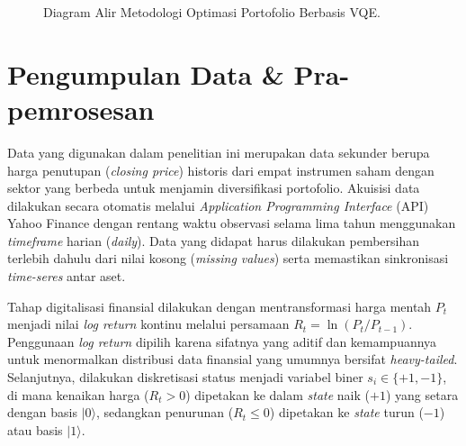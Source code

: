 \begin{figure}[ht]
    \caption{Diagram Alir Metodologi Optimasi Portofolio Berbasis VQE.}
    \label{fig:flowchart}
\end{figure}
\section{Pengumpulan Data \& Pra-pemrosesan}
Data yang digunakan dalam penelitian ini merupakan data sekunder berupa harga penutupan (\textit{closing price}) historis dari empat instrumen saham dengan sektor yang berbeda untuk menjamin diversifikasi portofolio. Akuisisi data dilakukan secara otomatis melalui \textit{Application Programming Interface} (API) Yahoo Finance dengan rentang waktu observasi selama lima tahun menggunakan \textit{timeframe} harian (\textit{daily}). Data yang didapat harus dilakukan pembersihan terlebih dahulu dari nilai kosong (\textit{missing values}) serta memastikan sinkronisasi \textit{time-seres} antar aset.

Tahap digitalisasi finansial dilakukan dengan mentransformasi harga mentah $P_t$ menjadi nilai \textit{log return} kontinu melalui persamaan $R_t = \ln(P_t / P_{t-1})$. Penggunaan \textit{log return} dipilih karena sifatnya yang aditif dan kemampuannya untuk menormalkan distribusi data finansial yang umumnya bersifat \textit{heavy-tailed}. Selanjutnya, dilakukan diskretisasi status menjadi variabel biner $s_i \in \{+1, -1\}$, di mana kenaikan harga ($R_t > 0$) dipetakan ke dalam \textit{state} naik ($+1$) yang setara dengan basis $|0\rangle$, sedangkan penurunan ($R_t \leq 0$) dipetakan ke \textit{state} turun ($-1$) atau basis $|1\rangle$.


